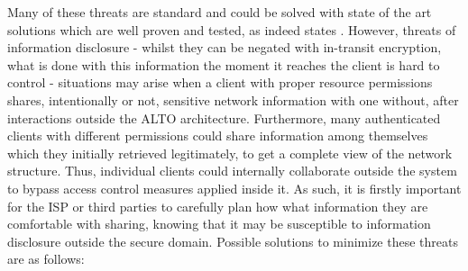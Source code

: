     Many of these threats are standard and could be solved with state of the art solutions which are well proven and tested, as indeed states \cite{alto-protocol}.
    However, threats of information disclosure - whilst they can be negated with in-transit encryption, what is done with this information the moment it reaches the client is hard to control - situations may arise when a client with proper resource permissions shares, intentionally or not, sensitive network information with one without, after interactions outside the ALTO architecture.
    Furthermore, many authenticated clients with different permissions could share information among themselves which they initially retrieved legitimately, to get a complete view of the network structure.
    Thus, individual clients could internally collaborate outside the system to bypass access control measures applied inside it.
    As such, it is firstly important for the ISP or third parties to carefully plan how what information they are comfortable with sharing, knowing that it may be susceptible to information disclosure outside the secure domain.
    Possible solutions to minimize these threats are as follows:

